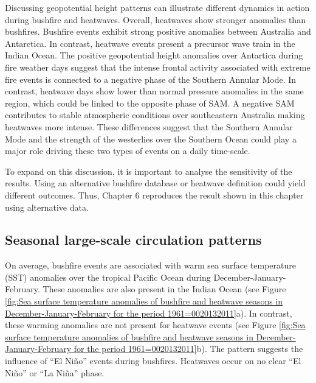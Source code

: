 Discussing geopotential height patterns can illustrate different dynamics
in action during bushfire and heatwaves. Overall, heatwaves show stronger
anomalies than bushfires. Bushfire events exhibit strong positive
anomalies between Australia and Antarctica. In contrast, heatwave
events present a precursor wave train in the Indian Ocean. 
The positive geopotential height anomalies over Antartica during fire weather days suggest that the intense frontal activity associated with extreme fire events is connected to a negative phase of the Southern Annular Mode. In contrast,  heatwave days show lower than normal pressure anomalies in the same region, which could be linked to the opposite phase of SAM. A negative SAM contributes to stable atmospheric conditions over southeastern Australia making heatwaves more intense. These differences suggest that the Southern Annular Mode and the strength of the westerlies over the Southern Ocean could play a major role driving these two types of events on a daily time-scale.

To expand on this discussion, it is important to analyse the sensitivity
of the results. Using an alternative bushfire database or heatwave
definition could yield different outcomes. Thus, Chapter 6 reproduces
the result shown in this chapter using alternative data.

\subsection{Seasonal large-scale circulation patterns}

On average, bushfire events are associated with warm sea surface temperature (SST)
anomalies over the tropical Pacific Ocean during December-January-February.
These anomalies are also present in the Indian Ocean (see Figure \ref{fig:Sea surface temperature anomalies of bushfire and heatwave seasons in December-January-February for the period 1961=0020132011}a).
In contrast, these warming anomalies are not present for heatwave
events (see Figure \ref{fig:Sea surface temperature anomalies of bushfire and heatwave seasons in December-January-February for the period 1961=0020132011}b).
The pattern suggests the influence of ``El Ni\~no'' events during
bushfires. Heatwaves occur on no clear ``El Ni\~no'' or ``La Ni\~na'' phase. 

